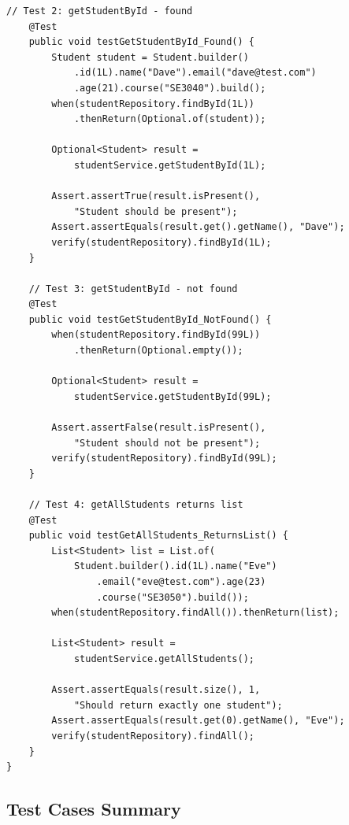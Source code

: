 \documentclass[12pt,a4paper]{article}
\begin{document}
\begin{lstlisting}[style=javastyle, caption={\texttt{StudentServiceTest.java} -- Member 2's fixture and mocking tests}]
    // Test 2: getStudentById - found
    @Test
    public void testGetStudentById_Found() {
        Student student = Student.builder()
            .id(1L).name("Dave").email("dave@test.com")
            .age(21).course("SE3040").build();
        when(studentRepository.findById(1L))
            .thenReturn(Optional.of(student));

        Optional<Student> result =
            studentService.getStudentById(1L);

        Assert.assertTrue(result.isPresent(),
            "Student should be present");
        Assert.assertEquals(result.get().getName(), "Dave");
        verify(studentRepository).findById(1L);
    }

    // Test 3: getStudentById - not found
    @Test
    public void testGetStudentById_NotFound() {
        when(studentRepository.findById(99L))
            .thenReturn(Optional.empty());

        Optional<Student> result =
            studentService.getStudentById(99L);

        Assert.assertFalse(result.isPresent(),
            "Student should not be present");
        verify(studentRepository).findById(99L);
    }

    // Test 4: getAllStudents returns list
    @Test
    public void testGetAllStudents_ReturnsList() {
        List<Student> list = List.of(
            Student.builder().id(1L).name("Eve")
                .email("eve@test.com").age(23)
                .course("SE3050").build());
        when(studentRepository.findAll()).thenReturn(list);

        List<Student> result =
            studentService.getAllStudents();

        Assert.assertEquals(result.size(), 1,
            "Should return exactly one student");
        Assert.assertEquals(result.get(0).getName(), "Eve");
        verify(studentRepository).findAll();
    }
}
\end{lstlisting}

\subsection{Test Cases Summary}
\end{document}
